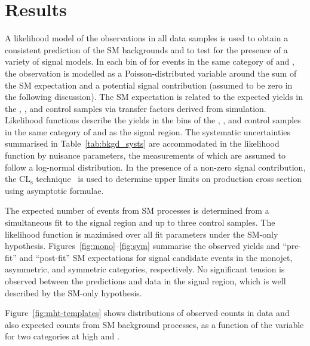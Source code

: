\section{Results}
\label{sec:interpretation}

A likelihood model of the observations in all data samples is used to
obtain a consistent prediction of the SM backgrounds and to test for
the presence of a variety of signal models.  In each bin of \scalht
for events in the same category of \njet and \nb, the observation is
modelled as a Poisson-distributed variable around the sum of the SM
expectation and a potential signal contribution (assumed to be zero in
the following discussion). The SM expectation is related to the
expected yields in the \mj, \mmj, and \gj control samples via transfer
factors derived from simulation. Likelihood functions describe the
yields in the \scalht bins of the \mj, \mmj, and \gj control samples
in the same category of \njet and \nb as the signal region. The
systematic uncertainties summarised in Table~\ref{tab:bkgd_systs} are
accommodated in the likelihood function by nuisance parameters, the
measurements of which are assumed to follow a log-normal
distribution. In the presence of a non-zero signal contribution, the
CL$_{\mathrm{s}}$ technique~\cite{read, Cowan:2010js} is used to
determine upper limits on production cross section using asymptotic
formulae.

The expected number of events from SM processes is determined from a
simultaneous fit to the signal region and up to three control
samples. The likelihood function is maximised over all fit parameters
under the SM-only hypothesis.
Figures~\ref{fig:mono}--\ref{fig:sym}
summarise the observed yields and ``pre-fit'' and ``post-fit'' SM
expectations for signal candidate events in the monojet, asymmetric,
and symmetric categories, respectively. No significant tension is
observed between the predictions and data in the signal region, which
is well described by the SM-only hypothesis.

Figure~\ref{fig:mht-templates} shows distributions of observed counts
in data and also expected counts from SM background processes, as a
function of the \mht variable for two \nb categories at high \njet and
\scalht. %

